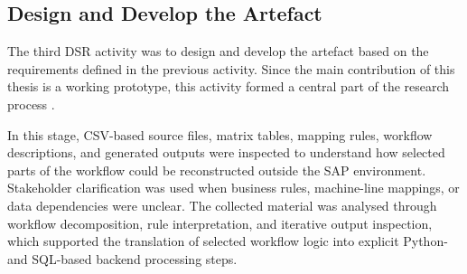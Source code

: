 

\subsection{Design and Develop the Artefact}

The third DSR activity was to design and develop the artefact based on the requirements defined in the previous activity. Since the main contribution of this thesis is a working prototype, this activity formed a central part of the research process \cite{johannesson2021,hevner2004design}.

In this stage, CSV-based source files, matrix tables, mapping rules, workflow descriptions, and generated outputs were inspected to understand how selected parts of the workflow could be reconstructed outside the SAP environment. Stakeholder clarification was used when business rules, machine-line mappings, or data dependencies were unclear. The collected material was analysed through workflow decomposition, rule interpretation, and iterative output inspection, which supported the translation of selected workflow logic into explicit Python- and SQL-based backend processing steps.

